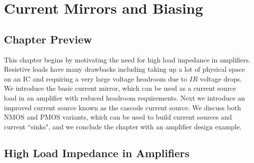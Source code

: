 \chapter{Current Mirrors and Biasing}
\graphicspath{{./figs_current_source/}}
\section{Chapter Preview}
This chapter begins by motivating the need for high load impedance in amplifiers.  Resistive loads have many drawbacks including taking up a lot of physical space on an IC and requiring a very large voltage headroom due to $IR$ voltage drops.  We introduce the basic current mirror, which can be used as a current source load in an amplifier with reduced headroom requirements.  Next we introduce an improved current source known as the cascode current source.  We discuss both NMOS and PMOS variants, which can be used to build current sources and current ``sinks", and we conclude the chapter with an amplifier design example.
\section{High Load Impedance in Amplifiers}
